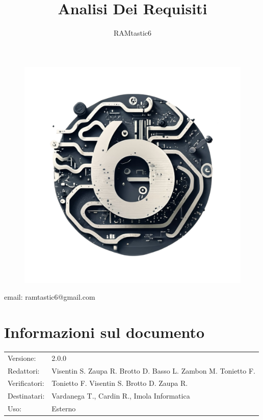\documentclass[12pt, oneside]{article}
\author{RAMtastic6}
\begin{document}
\thispagestyle{empty}
\title{Analisi Dei Requisiti}
\maketitle
\begin{figure}[h]
  \centering
  \includegraphics[scale=0.3]{logo.png}
\end{figure}
\begin{center}
    email: ramtastic6@gmail.com
\end{center}

\section*{Informazioni sul documento} 
\begin{tabular}{ll}
Versione: & 2.0.0 \\
Redattori: &  Visentin S.  Zaupa R. Brotto D. Basso L. Zambon M. Tonietto F. \\ 
Verificatori: & Tonietto F. Visentin S. Brotto D. Zaupa R.\\
Destinatari: & Vardanega T., Cardin R., Imola Informatica \\
Uso: & Esterno
\end{tabular}
\newpage
\end{document}
